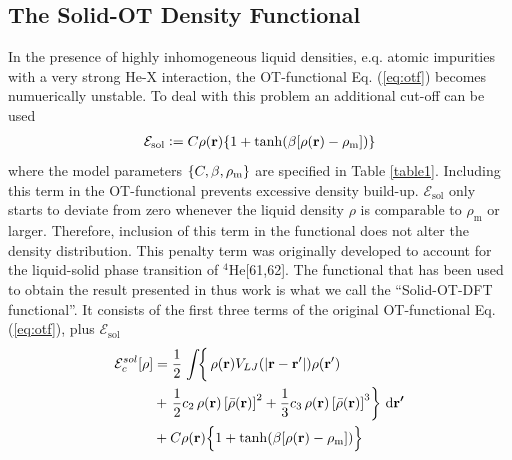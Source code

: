 \documentclass[12pt,a4paper,twosides]{book}
\renewcommand{\vec}[1]{\bm{\mathrm{#1}}}
\newcommand{\diff}[1]{\,\mathrm{d}{\vec{#1}}}
\begin{document}
		\subsection{The Solid-OT Density Functional}
			In the presence of highly inhomogeneous liquid densities, e.q. atomic impurities with a very strong He-X interaction, the OT-functional Eq. (\ref{eq:otf}) becomes numuerically unstable. To deal with this problem an additional cut-off can be used
			\begin{align}
				\mathcal{E}_\mathrm{sol} \vcentcolon= C\rho(\vec{r})\qty{1+\tanh(\beta\qty[\rho(\vec{r})-\rho_\mathrm{m}])}
			\end{align}
			where the model parameters $\qty{C,\beta,\rho_\mathrm{m}}$ are specified in Table \ref{table1}. Including this term in the OT-functional prevents excessive density build-up. $\mathcal{E}_\mathrm{sol}$ only starts to deviate from zero whenever the liquid density $\rho$ is comparable to $\rho_\mathrm{m}$ or larger. Therefore, inclusion of this term in the functional does not alter the density distribution. This penalty term was originally developed to account for the liquid-solid phase transition of $^4$He[61,62]. The functional that has been used to obtain the result presented in thus work is what we call the ``Solid-OT-DFT functional''. It consists of the first three terms of the original OT-functional Eq. (\ref{eq:otf}), plus $\mathcal{E}_\mathrm{sol}$
			\begin{align}
				{\cal E}_c^{sol}[\rho] &=  
				\frac{1}{2} \left.\int \! \right\{\rho({\bf r}) V_{LJ}(|{\bf r}-{\bf r'}|) \rho({\bf r'}) \nonumber \\
				&+ \left.\frac{1}{2} c_2\, \rho({\bf r}) \left[{\bar \rho}({\bf r}) \right]^2 
				+ \frac{1}{3} c_3 \, \rho({\bf r}) \left[ {\bar \rho}({\bf r}) \right]^3\right\}\diff{r'} \nonumber \\
				&+ C\rho(\vec{r})\qty\Big{1+\tanh(\beta\qty[\rho(\vec{r})-\rho_\mathrm{m}])} \label{eq:solid-otf}
			\end{align}

	\clearpage
\end{document}
